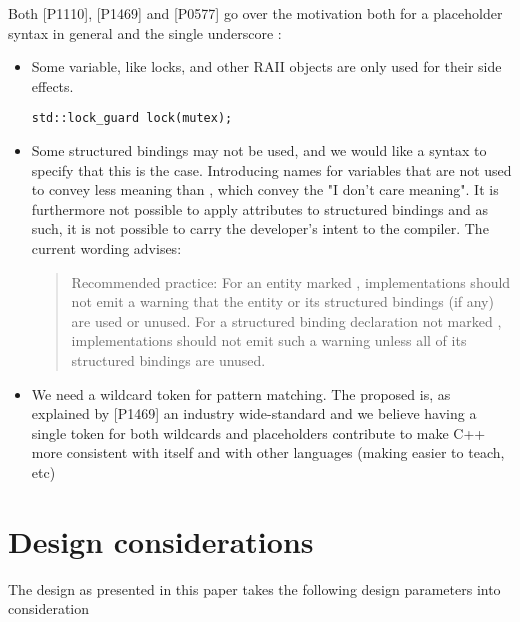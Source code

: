 \documentclass{wg21}
\begin{document}
Both [P1110]\cite{P1110R0}, [P1469]\cite{P1469R0} and [P0577]\cite{P0577R0} go over the motivation both for a placeholder syntax in general and
the single underscore \tcode{_}:

\begin{itemize}
\item Some variable, like locks,  and other RAII objects are only used for their side effects.

\begin{lstlisting}[style=color]
std::lock_guard lock(mutex);
\end{lstlisting}

\item Some structured bindings may not be used, and we would like a syntax to specify that this is the case. Introducing names for variables that
are not used to convey less meaning than \tcode{_}, which convey the "I don't care meaning".
It is furthermore not possible to apply attributes to structured bindings and as such, it is not possible to carry the developer's intent to
the compiler.
The current wording advises:

\begin{quote}
Recommended practice: For an entity marked , implementations should not emit a warning that the entity or its structured bindings (if any) are used or unused. For a structured binding declaration not marked , implementations should not emit such a warning unless all of its structured bindings are unused.
\end{quote}

\item We need a wildcard token for pattern matching. The proposed \tcode{_} is, as explained by [P1469]\cite{P1469R0}
an industry wide-standard and we believe having a single token \tcode{_} for both wildcards and placeholders contribute
to make C++ more consistent with itself and with other languages (making easier to teach, etc)

\end{itemize}

\section{Design considerations}

The design as presented in this paper takes the following design parameters into consideration
\end{document}
